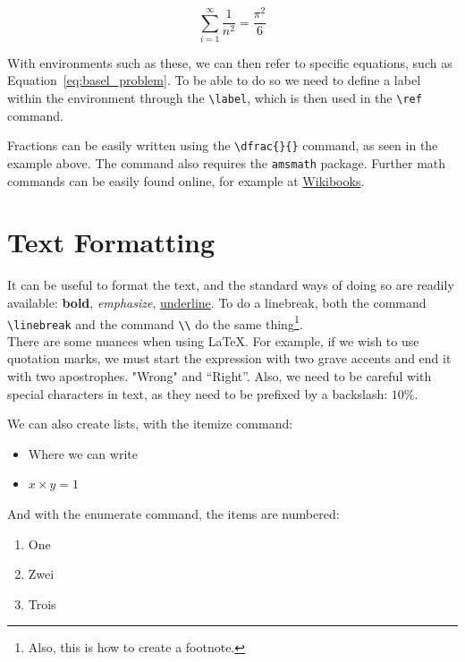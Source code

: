 \documentclass[10pt]{article}
\begin{document}
\begin{equation}
    \sum_{i=1}^{\infty}\dfrac{1}{n^{2}} = \dfrac{\pi^{2}}{6}
    \label{eq:basel_problem}
\end{equation}

With environments such as these, we can then refer to specific equations, such as Equation~\ref{eq:basel_problem}.
To be able to do so we need to define a label within the environment through the \verb|\label|, which is then used in the \verb|\ref| command.


Fractions can be easily written using the \verb|\dfrac{}{}| command, as seen in the example above. The command also requires the \verb|amsmath| package. Further math commands can be easily found online, for example at \href{https://en.wikibooks.org/wiki/LaTeX/Mathematics}{Wikibooks}. 


\section{Text Formatting}
\label{sec:text_format}

It can be useful to format the text, and the standard ways of doing so are readily available: \textbf{bold}, \emph{emphasize}, \underline{underline}. To do a linebreak, both the command \verb|\linebreak| and the command \verb|\\| do the same thing\footnote{Also, this is how to create a footnote.}.\\
There are some nuances when using \LaTeX. For example, if we wish to use quotation marks, we must start the expression with two grave accents and end it with two apostrophes. "Wrong" and ``Right''. Also, we need to be careful with special characters in text, as they need to be prefixed by a backslash: $10\%$.

We can also create lists, with the itemize command:

\begin{itemize}
    \item Where we can write
    \item $x\times y = 1$
\end{itemize}

And with the enumerate command, the items are numbered:

\begin{enumerate}
    \item One
    \item Zwei
    \item Trois
\end{enumerate}
\end{document}

